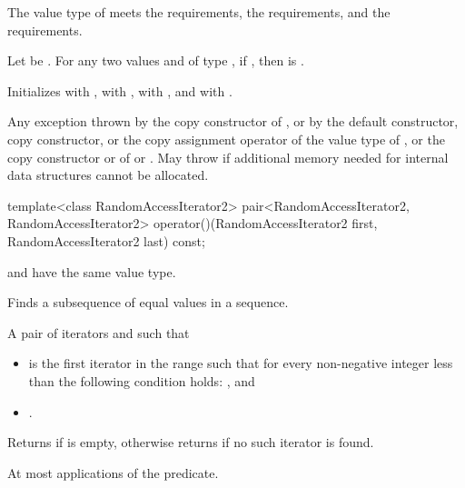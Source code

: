 \begin{itemdescr}
\pnum
\expects
The value type of  meets
the  requirements,
the  requirements, and
the  requirements.

\pnum
\expects
Let  be .
For any two values  and  of type ,
if , then  is .

\pnum
\effects
Initializes
 with ,
 with ,
 with , and
 with .

\pnum
\throws
Any exception thrown by the copy constructor of ,
or by the default constructor, copy constructor, or the copy assignment operator of the value type of ,
or the copy constructor or  of  or .
May throw  if additional memory needed for internal data structures cannot be allocated.
\end{itemdescr}

%
\begin{itemdecl}
template<class RandomAccessIterator2>
  pair<RandomAccessIterator2, RandomAccessIterator2>
    operator()(RandomAccessIterator2 first, RandomAccessIterator2 last) const;
\end{itemdecl}

\begin{itemdescr}
\pnum
\mandates
{} and 
have the same value type.

\pnum
\effects
Finds a subsequence of equal values in a sequence.

\pnum
\returns
A pair of iterators  and  such that
\begin{itemize}
\item {} is the first iterator
in the range  such that
for every non-negative integer  less than 
the following condition holds:
, and
\item {}.
\end{itemize}
Returns  if  is empty,
otherwise returns  if no such iterator is found.

\pnum
\complexity
At most  applications of the predicate.
\end{itemdescr}

